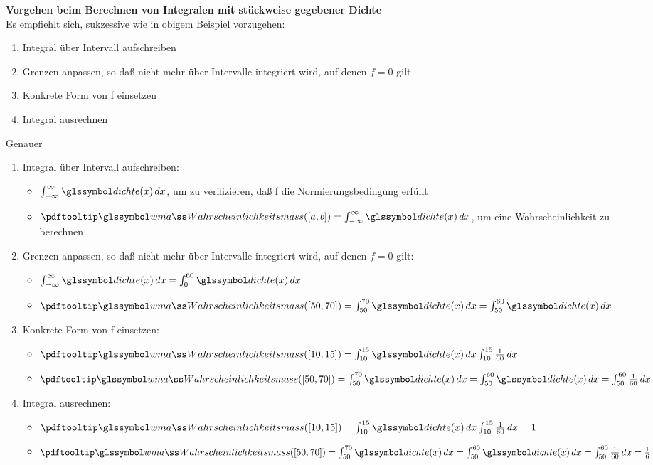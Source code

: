 \begin{bem}
    \textbf{Vorgehen beim Berechnen von Integralen mit stückweise gegebener Dichte}
     \\
    Es empfiehlt sich, sukzessive wie in obigem Beispiel vorzugehen:
    \begin{enumerate}
        \item Integral über Intervall aufschreiben
        \item Grenzen anpassen, so daß nicht mehr über Intervalle integriert wird, auf denen $f = 0$ gilt
        \item Konkrete Form von f einsetzen
        \item Integral ausrechnen
    \end{enumerate}
    Genauer
    \begin{enumerate}
        \item Integral über Intervall aufschreiben:
        \begin{itemize}
            \item $\intinfs \dcht(x) \dx$, um zu verifizieren, daß f die Normierungsbedingung erfüllt
            \item $\pe([a, b]) = \intinfs \dcht(x) \dx$, um eine Wahrscheinlichkeit zu berechnen
        \end{itemize}
        \item Grenzen anpassen, so daß nicht mehr über Intervalle integriert wird, auf denen $f = 0$ gilt:
        \begin{itemize}
            \item $\intinfs \dcht(x) \dx = \int_0^{60} \dcht(x) \dx$
            \item $\pe([50, 70]) = \int_{50}^{70} \dcht(x) \dx  = \int_{50}^{60} \dcht(x) \dx $
        \end{itemize}
        \item Konkrete Form von f einsetzen:
        \begin{itemize}
            \item $ \pe([10, 15]) = \int_{10}^{15}  \dcht(x) \dx \int_{10}^{15} \frac{1}{60} \dx$
            \item $\pe([50, 70]) = \int_{50}^{70} \dcht(x) \dx  = \int_{50}^{60} \dcht(x) \dx =  \int_{50}^{60} \frac{1}{60} \dx$
        \end{itemize}
        \item Integral ausrechnen:
        \begin{itemize}
            \item $ \pe([10, 15]) = \int_{10}^{15}  \dcht(x) \dx \int_{10}^{15} \frac{1}{60} \dx = 1$
            \item $\pe([50, 70]) = \int_{50}^{70} \dcht(x) \dx  = \int_{50}^{60} \dcht(x) \dx =  \int_{50}^{60} \frac{1}{60} \dx = \frac{1}{6}$
        \end{itemize}
    \end{enumerate}
\end{bem}


